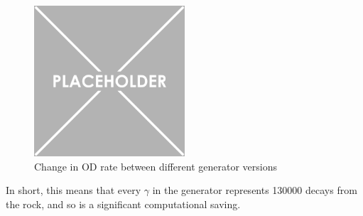 \par


\begin{figure}
    \centering
    \includegraphics[width=0.5\textwidth]{Figures/Placeholder.png}
    \caption{Change in OD rate between different generator versions}
    \label{fig:cavern_gamma_rate_difference}
\end{figure}


\par
In short, this means that every $\gamma$ in the generator represents 130000 decays from the rock, and so is a significant computational saving.